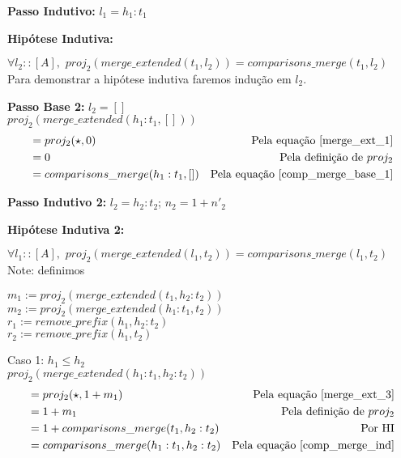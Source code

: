 \documentclass[12pt, oneside, a4paper,english,brazil]{abntex2}
\begin{document}
\textbf{Passo Indutivo: } $l_{1} = h_{1} : t_{1}$

\textbf{Hip\'otese Indutiva: }


\qquad $\forall l_{2} :: [A], \,\, proj_{2}(merge\_extended(t_{1}, l_{2})) = comparisons\_merge(t_{1}, l_{2})$ \\

Para demonstrar a hip\'otese indutiva faremos indu\c{c}\~ao em $l_{2}$.

\textbf{Passo Base 2: } $l_{2} = []$\\

$proj_{2}(merge\_extended(h_{1} : t_{1}, []))$
\begin{align*}
   &= proj_{2}(\star, 0) &\text{Pela equa\c{c}\~ao \ref{merge_ext_1}} \\
                                               &= 0 &\text{Pela defini\c{c}\~ao de $proj_{2}$} \\
  &= comparisons\_merge(h_{1} : t_{1}, []) &\text{Pela equa\c{c}\~ao \ref{comp_merge_base_1}}
\end{align*}

\textbf{Passo Indutivo 2: } $l_{2} = h_{2} : t_{2}$; $n_{2} = 1 + n'_{2}$

\textbf{Hip\'otese Indutiva 2: }

\qquad $\forall l_{1} :: [A], \,\, proj_{2}(merge\_extended(l_{1}, t_{2})) = comparisons\_merge(l_{1}, t_{2})$ \\

Note: definimos
\begin{center}
$m_{1} := proj_{2}(merge\_extended(t_{1}, h_{2} : t_{2}))$\\
$m_{2} := proj_{2}(merge\_extended(h_{1} : t_{1}, t_{2}))$\\
$r_{1} := remove\_prefix(h_{1}, h_{2} : t_{2})$\\
$r_{2} := remove\_prefix(h_{1}, t_{2})$
\end{center}

Caso 1: $h_{1} \le h_{2}$\\

$proj_{2}(merge\_extended(h_{1} : t_{1}, h_{2} : t_{2}))$
\begin{align*}
   &= proj_{2}(\star, 1 + m_{1}) &\text{Pela equa\c{c}\~ao \ref{merge_ext_3}}\\
  &= 1 + m_{1} &\text{Pela defini\c{c}\~ao de $proj_{2}$} \\
   &= 1 + comparisons\_merge(t_{1}, h_{2} : t_{2}) &\text{Por HI} \\
  &= comparisons\_merge(h_{1} : t_{1}, h_{2} : t_{2}) &\text{Pela equa\c{c}\~ao \ref{comp_merge_ind}}
\end{align*}
\end{document}
